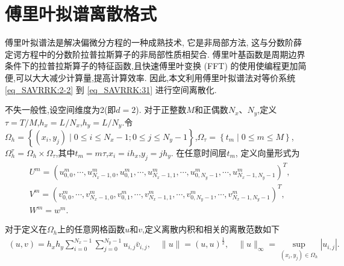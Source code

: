 \section{傅里叶拟谱离散格式}\label{Section_SAVRRK: 3}
傅里叶拟谱法是解决偏微分方程的一种成熟技术, 它是非局部方法,
这与分数阶薛定谔方程中的分数阶拉普拉斯算子的非局部性质相契合.
傅里叶基函数是周期边界条件下的拉普拉斯算子的特征函数,且快速傅里叶变换 (FFT) 的使用使编程更加简便,可以大大减少计算量,提高计算效率.
因此,本文利用傅里叶拟谱法对等价系统 \eqref{eq_SAVRRK:2-2} 到 \eqref{eq_SAVRRK:31} 进行空间离散化.

不失一般性,设空间维度为2(即$d=2$). 对于正整数$M$和正偶数$N_{x}$、$N_{y}$,定义$\tau={T}/{M}$,$h_{x}={L}/{N_{x}}$,$h_{y}={L}/{N_{y}}$.令$\Omega_{h}=\left\{(x_{i}, y_{j}) \mid 0 \leq i \leq N_x-1;0 \leq j \leq N_y-1\right\}$,$\Omega_{\tau}=\left\{t_{m} \mid 0 \leq m \leq M\right\}$,$\Omega_{h}^{\tau}=\Omega_{h} \times \Omega_{\tau}$,其中$t_{m}=m \tau$,$x_{i}=i h_{x}$,$y_{j}=j h_{y}$.
在任意时间层$t_m$, 定义向量形式为
\begin{align}\label{eq_SAVRRK:47}
&U^m=\left(u_{0,0}^m, \cdots, u_{N_{x}-1,0}^m, u_{0,1}^m, \cdots, u_{N_{x}-1,1}^m, \cdots, u_{0, N_{y}-1}^m, \cdots, u_{N_{x}-1, N_{y}-1}^m\right)^{T},\\
&V^m=\left(v_{0,0}^m, \cdots, v_{N_{x}-1,0}^m, v_{0,1}^m, \cdots, v_{N_{x}-1,1}^m, \cdots, v_{0, N_{y}-1}^m, \cdots, v_{N_{x}-1, N_{y}-1}^m\right)^{T},\\
&W^m=w^m.
\end{align}

对于定义在$\Omega_{h}$上的任意网格函数$u$和$v$,定义离散内积和相关的离散范数如下
\begin{align}\label{eq_SAVRRK:48}
(u, v)=h_{x} h_{y} \sum_{i=0}^{N_{x}-1} \sum_{j=0}^{N_{y}-1} u_{i, j} \bar{v}_{i, j},\quad\|u\|=(u, u)^{\frac{1}{2}},\quad\|u\|_{\infty}=\sup _{\left(x_{i}, y_{j}\right) \in \Omega_{h}}\left|u_{i, j}\right|.
\end{align}

